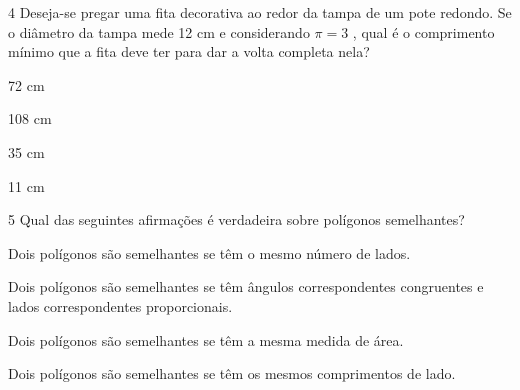 \pagebreak

\num{4} Deseja-se pregar uma fita decorativa ao redor da tampa de um pote
redondo. Se o diâmetro da tampa mede 12 cm e considerando $\pi = 3$ , qual é o comprimento mínimo
que a fita deve ter para dar a volta completa nela?


\begin{escolha}
\item 72 cm
\item 108 cm
\item 35 cm
\item 11 cm
\end{escolha}







\num{5} Qual das seguintes afirmações é verdadeira sobre polígonos
semelhantes?

\begin{escolha}
\item Dois polígonos são semelhantes se têm o mesmo número de lados.
\item Dois polígonos são semelhantes se têm ângulos correspondentes
congruentes e lados correspondentes proporcionais.
\item Dois polígonos são semelhantes se têm a mesma medida de área.
\item Dois polígonos são semelhantes se têm os mesmos comprimentos de lado.
\end{escolha}


